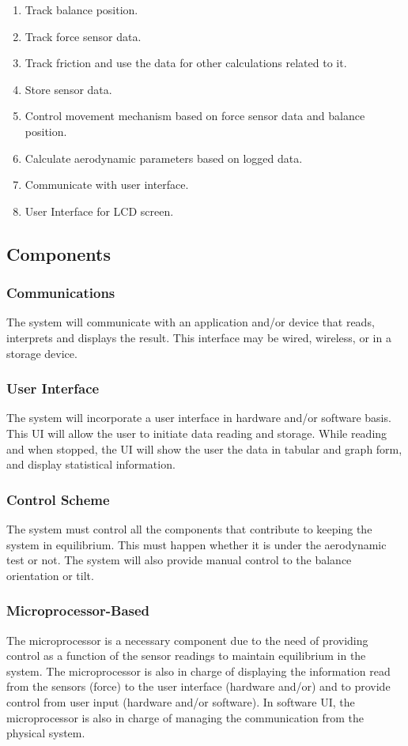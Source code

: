 		\begin{enumerate}
			\item Track balance position.
			\item Track force sensor data.
			\item Track friction and use the data for other calculations related to it.
			\item Store sensor data.	
			\item Control movement mechanism based on force sensor data and balance position.
			\item Calculate aerodynamic parameters based on logged data.
			\item Communicate with user interface.
			\item User Interface for LCD screen. 

		\end{enumerate}


	\subsection{Components}
		\subsubsection{Communications}
			The system will communicate with an application and/or device that reads, interprets and displays the result. This interface may be wired, wireless, or in a storage device.

		\subsubsection{User Interface}
			The system will incorporate a user interface in hardware and/or software basis. This UI will allow the user to initiate data reading and storage. While reading and when stopped,
			the UI will show the user the data in tabular and graph form, and display statistical
			information. 

		\subsubsection{Control Scheme}
			The system must control all the components that contribute to keeping the system in
			equilibrium. This must happen whether it is under the aerodynamic test or not. The
			system will also provide manual control to the balance orientation or tilt.

		\subsubsection{Microprocessor-Based}
			The microprocessor is a necessary component due to the need of providing control as a function of the sensor readings to maintain equilibrium in the system. The microprocessor is also in charge of displaying the information read from the sensors (force) to the user interface (hardware and/or) and to provide control from user input (hardware and/or software). In software UI, the microprocessor is also in charge of managing the communication from the physical system.